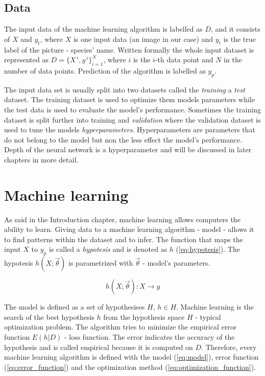 \documentclass[times, utf8, diplomski]{fer}
\begin{document}
\subsection{Data} \label{se:data}
The input data of the machine learning algorithm is labelled as $D$, and it consists of $X$ and $y_{t}$, where $X$ is one input data (an image in our case) and $y_{t}$ is the true label of the picture - species' name. Written formally the whole input dataset is represented as $D = \{{X}^{\,i},y^{\,i}\}^{N}_{i=1}$, where $i$ is the $i$-th data point and $N$ in the number of data points. Prediction of the algorithm is labelled as $y_{p}$.

The input data set is usually split into two datasets called the \textit{training} a \textit{test} dataset. The training dataset is used to optimize them models parameters while the test data is used to evaluate the model's performance. Sometimes the training dataset is split further into training and \textit{validation} where the validation dataset is used to tune the models \textit{hyperparameters}. Hyperparameters are parameters that do not belong to the model but non the less effect the model's performance. Depth of the neural network is a hyperparameter and will be discussed in later chapters in more detail.


\section{Machine learning}
As said in the Introduction chapter, machine learning allows computers the ability to learn. Giving data to a machine learning algorithm - model - allows it to find patterns within the dataset and to infer. The function that maps the input $X$ to $y_p$ is called a \textit{hypotesis} and is denoted as $h$ (\ref{eq:hypotesis}). The hypotesis $h(X ; \vec{\theta})$ is parametrized with $\vec{\theta}$ - model's parameters.

\begin{equation} \label{eq:hypotesis}
	h(X ; \vec{\theta}) : X \to y
\end{equation}


The model is defined as a set of hypothesises $H$, $h \in H$. Machine learning is the search of the best hypothesis $h$ from the hypothesis space $H$ - typical optimization problem. The algorithm tries to minimize the empirical error function $E(h|D)$ - loss function. The error indicates the accuracy of the hypothesis and is called empirical because it is computed on $D$. Therefore, every machine learning algorithm is defined with the model (\ref{eq:model}), error function (\ref{eq:error_function}) and the optimization method (\ref{eq:optimization_function}).
\end{document}
